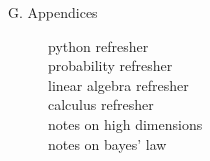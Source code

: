 \documentclass[11pt, justified]{tufte-book}
\newcommand{\phdot}{\phantom{.}}
\theoremstyle{definition}
\begin{document}
{\begin{description}
      \item[G. Appendices] \phdot 
        \begin{description}
          \item[python refresher] \phdot
          \item[probability refresher] \phdot
          \item[linear algebra refresher] \phdot
          \item[calculus refresher] \phdot
          \item[notes on high dimensions] \phdot
          \item[notes on bayes' law] \phdot
        \end{description}
    \end{description}
  }
\end{document}
